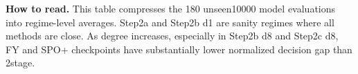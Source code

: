 \documentclass[11pt]{article}
\begin{document}
\noindent\textbf{How to read.} This table compresses the 180 unseen10000 model evaluations into regime-level averages. Step2a and Step2b d1 are sanity regimes where all methods are close. As degree increases, especially in Step2b d8 and Step2c d8, FY and SPO+ checkpoints have substantially lower normalized decision gap than 2stage.
\end{document}
